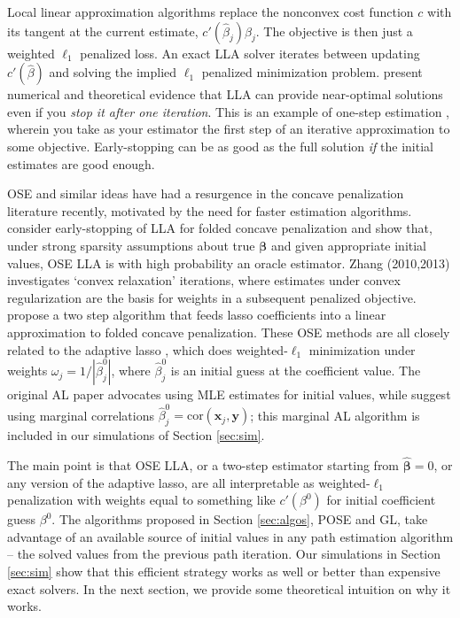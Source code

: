 \documentclass[12pt]{article}
\newcommand{\bs}[1]{\boldsymbol{#1}}
\newcommand{\mr}[1]{\mathrm{#1}}
\newcommand{\bm}[1]{\mathbf{#1}}
\begin{document}
Local linear approximation \cite[LLA; e.g.,][]{candes_enhancing_2008}
algorithms replace the nonconvex cost function $c$  with its tangent at the
current estimate, $c'(\hat\beta_j)\beta_j$.  The objective is then just a
weighted $\ell_1$ penalized loss. An exact LLA solver iterates between updating
$c'(\hat\beta)$ and solving the implied $\ell_1$ penalized minimization problem.
\citet{zou_one-step_2008} present numerical and theoretical evidence that LLA
can provide near-optimal solutions even if you {\it stop it
after one iteration}. This is an example of one-step estimation \cite[OSE;][]{bickel_one-step_1975}, wherein you take as
your estimator the first step of an iterative approximation to some objective.
Early-stopping can be as good  as the full solution {\it if} the
initial estimates are good enough.

OSE and similar ideas have had a resurgence in the concave penalization
literature recently, motivated by the need for faster estimation algorithms.
\cite{fan_strong_2014} consider early-stopping of LLA for folded concave
penalization  and show that, under strong sparsity assumptions about true
$\bs{\beta}$ and given appropriate initial values, OSE LLA is with high
probability an oracle estimator.   Zhang (2010,2013)
\nocite{zhang_analysis_2010,zhang_multi-stage_2013} investigates  
`convex relaxation' iterations, where estimates under convex regularization
 are the basis for weights in a subsequent penalized objective.
 \cite{wang_calibrating_2013} propose a two step algorithm that feeds lasso
 coefficients into a linear approximation to folded concave penalization.
 These OSE methods are all closely related to  the adaptive lasso
\citep[AL;][]{zou_adaptive_2006}, which does weighted-$\ell_1$ minimization under
weights $\omega_j = 1/|\hat\beta^0_j|$, where $\hat\beta^0_j$ is an initial
guess at the coefficient value.  The original AL paper advocates using MLE
estimates for initial values, while
\cite{huang_adaptive_2008} suggest using marginal correlations
$\hat\beta^0_j = \mr{cor}(\bm{x}_j,\bm{y})$; this marginal AL algorithm is included in our simulations of Section \ref{sec:sim}.

The main point is that OSE LLA, or a two-step estimator starting from
$\bs{\hat\beta}=0$, or any version of the adaptive lasso, are all  interpretable as weighted-$\ell_1$ 
penalization with weights equal to something like $c'(\beta^0)$ for initial
coefficient guess $\beta^0$. The algorithms proposed in Section \ref{sec:algos}, POSE and GL, take advantage of an  available
source of initial values in any path estimation algorithm -- the solved values
from the previous path iteration.  Our  simulations in Section \ref{sec:sim}
show that this efficient strategy works as well or better than  expensive
exact solvers.  In the next section, we provide some theoretical intuition on
why it works.
\end{document}
